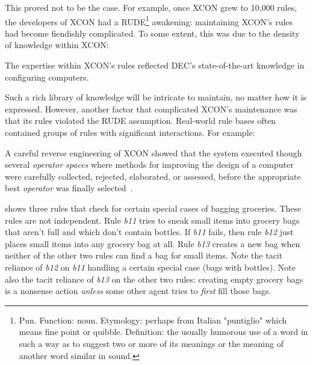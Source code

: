 \documentclass[twocolumn,global]{sys/svjour}
\begin{document}
This proved not to be the case.  For example, once XCON grew to
10,000 rules, the developers of XCON had a RUDE\footnote{Pun.
Function: noun. Etymology: perhaps from Italian "puntiglio" which
means fine point or quibble. Definition: the usually humorous use of
a word in such a way as to suggest two or more of its meanings or the
meaning of another word similar in sound.} awakening: maintaining
XCON's rules had become fiendishly complicated. To some extent, this
was due to the density of knowledge within XCON: \bi \item The
expertise within XCON's rules reflected DEC's state-of-the-art
knowledge in configuring computers. \item Such a rich library of
knowledge will be intricate to maintain, no matter how it is
expressed. \ei However, another factor that complicated XCON's
maintenance was that its rules violated the RUDE assumption.
Real-world rule bases often contained groups of rules with
significant interactions. For example: \bi \item A careful reverse
engineering of XCON showed that the system executed though several
{\em operator spaces} where methods for improving the design of a
computer were carefully collected, rejected, elaborated, or assessed,
before the appropriate best {\em operator} was finally
selected~\cite{bachant84}. \item {} shows three
rules that check for certain special cases of bagging groceries.
These rules are not independent. Rule {\em b11} tries to sneak small
items into grocery bags that aren't full and which don't contain
bottles. If {\em b11} fails, then rule {\em b12} just places small
items into any grocery bag at all. Rule {\em b13} creates a new bag
when neither of the other two rules can find a bag for small items.
Note the tacit reliance of {\em b12} on {\em b11} handling a certain
special case (bags with bottles). Note also the tacit reliance of
{\em b13} on the other two rules: creating empty grocery bags is a
nonsense action {\em unless} some other agent tries to {\em first}
fill those bags. \ei




\end{document}
